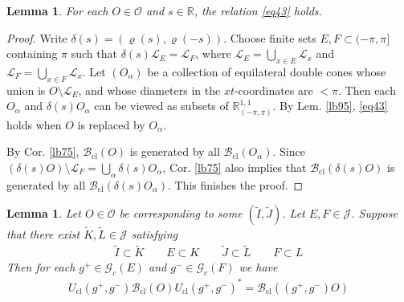 \documentclass[11pt,b5paper,notitlepage]{article}
\theoremstyle{definition}
\theoremstyle{plain}
\newtheorem{lm}[df]{Lemma}
\newcommand{\wtd}{\widetilde}
\newcommand{\Rbb}{\mathbb R}
\newcommand{\Gc}{\mathscr G_c}
\newcommand{\MJ}{\mathcal J}
\newcommand{\MO}{\mathcal O}
\newcommand{\Rpp}{\mathbb R^{1,1}_{(-\pi,\pi)}}
\newcommand{\Bcl}{\mathcal B_{\mathrm{cl}}}
\newcommand{\SL}{\mathscr L}
\newcommand{\Ucl}{U_{\mathrm{cl}}}
\numberwithin{equation}{section}
\begin{document}
\begin{lm}\label{lb96}
For each $O\in\MO$ and $s\in\Rbb$, the relation \eqref{eq43} holds.
\end{lm}

\begin{proof}
Write $\delta(s)=(\varrho(s),\varrho(-s))$. Choose finite sets $E,F\subset(-\pi,\pi]$ containing $\pi$ such that $\delta(s)\SL_E=\SL_F$, where $\SL_E=\bigcup_{x\in E}\SL_x$ and $\SL_F=\bigcup_{x\in F}\SL_x$. Let $(O_\alpha)$ be a collection of equilateral double cones whose union is $O\setminus\SL_E$, and whose diameters in the $xt$-coordinates are $<\pi$. Then each $O_\alpha$ and $\delta(s)O_\alpha$ can be viewed as subsets of $\Rpp$. By Lem. \ref{lb95}, \eqref{eq43} holds when $O$ is replaced by $O_\alpha$. 

By Cor. \ref{lb75}, $\Bcl(O)$ is generated by all $\Bcl(O_\alpha)$. Since $(\delta(s)O)\setminus\SL_F=\bigcup_\alpha \delta(s)O_\alpha$, Cor. \ref{lb75} also implies that $\Bcl(\delta(s)O)$ is generated by all $\Bcl(\delta(s)O_\alpha)$. This finishes the proof.
\end{proof}


\begin{lm}\label{lb97}
Let $O\in\MO$ be corresponding to some $(\wtd I,\wtd J)$. Let $E,F\in\MJ$. Suppose that there exist $\wtd K,\wtd L\in\MJ$ satisfying
\begin{align*}
\wtd I\subset\wtd K\qquad E\subset K\qquad \wtd J\subset \wtd L\qquad F\subset L
\end{align*}
Then for each $g^+\in\Gc(E)$ and $g^-\in\Gc(F)$ we have
\begin{align*}
\Ucl(g^+,g^-)\Bcl(O)\Ucl(g^+,g^-)^*=\Bcl((g^+,g^-)O)
\end{align*}
\end{lm}
\end{document}
